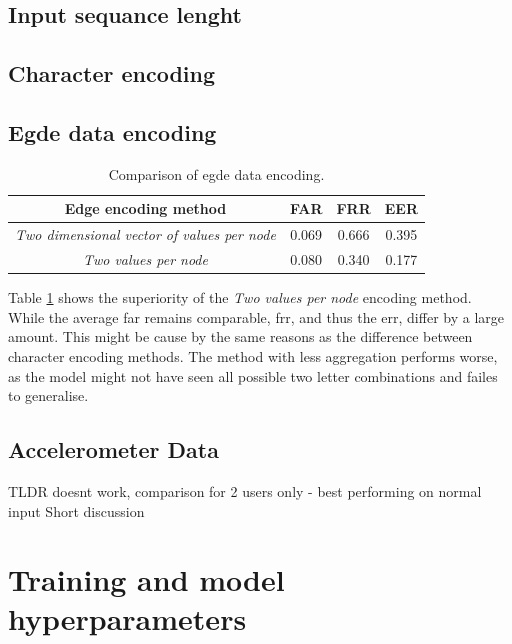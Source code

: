 \subsection{Input sequance lenght}

\subsection{Character encoding}


\subsection{Egde data encoding}

\begin{center}
	\begin{table}[H]
		\begin{center}
			\begin{tabular}{ |c|c|c|c| } 
				\hline
				Edge encoding method & FAR & FRR & EER \\
				\hline
				\textit{Two dimensional vector of values per node} & 0.069 & 0.666 & 0.395 \\
				\hline
				\textit{Two values per node} & 0.080 & 0.340 & 0.177 \\
				\hline
			\end{tabular}
		\end{center}
		\caption{Comparison of egde data encoding.}
		\label{table:egde_encoding_comp}
	\end{table}
\end{center}

Table \ref{table:egde_encoding_comp} shows the superiority of the \textit{Two values per node} encoding method. While the average far remains comparable, frr, and thus the err, differ by a large amount. This might be cause by the same reasons as the difference between character encoding methods. The method with less aggregation performs worse, as the model might not have seen all possible two letter combinations and failes to generalise.

\subsection{Accelerometer Data}
TLDR doesnt work, comparison for 2 users only - best performing on normal input
Short discussion

\section{Training and model hyperparameters}

